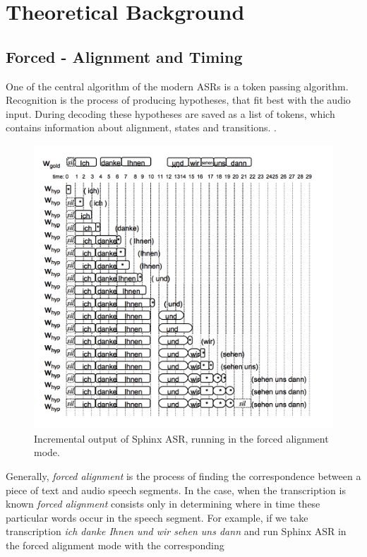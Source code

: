 \chapter{Theoretical Background}
\label{chap:terms}
 \section {Forced - Alignment and Timing} 
One of the central algorithm  of the modern ASRs is  a token passing
algorithm. Recognition is the process of producing hypotheses, that fit best
with the audio input. During decoding these hypotheses are
saved as a list of tokens, which contains information about alignment, states
and transitions. \parencite {Young89Token}.
\begin{figure}[htbp]
  \centering
   \includegraphics[width=1\textwidth]{images/sphinxfa_output.png}
  \caption{Incremental output of Sphinx ASR, running in the forced alignment
  mode.}
  \label{fig:sphinxfa}
\end{figure}
Generally, \textit {forced alignment} is the process of finding the
correspondence between a piece of text and audio speech segments. In the case,
when the transcription is known \textit {forced alignment} consists only in
determining where in time these particular words occur in the speech segment. 
For example, if we take transcription \textit {ich danke Ihnen und wir sehen uns
dann} and run Sphinx ASR in the forced alignment mode with the corresponding
